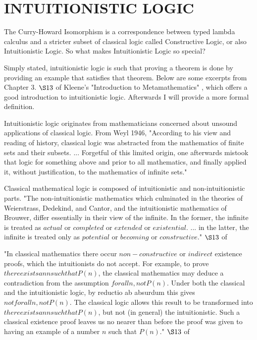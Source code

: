 %
%
\chapter{INTUITIONISTIC LOGIC}\label{ch:logic}
The Curry-Howard Isomorphism is a correspondence between typed lambda calculus and a stricter subset of classical logic called Constructive Logic, or also Intuitionistic Logic. So what makes Intuitionistic Logic so special?

Simply stated, intuitionistic logic is such that proving a theorem is done by providing an example that satisfies that theorem. Below are some excerpts from Chapter 3. $\S 13$ of Kleene's "Introduction to Metamathematics" \cite{metamath}, which offers a good introduction to intuitionistic logic. Afterwards I will provide a more formal definition.

Intuitionistic logic originates from mathematicians concerned about unsound applications of classical logic. From Weyl 1946, "According to his view and reading of history, classical logic was abstracted from the mathematics of finite sets and their subsets. ... Forgetful of this limited origin, one afterwards mistook that logic for something above and prior to all mathematics, and finally applied it, without justification, to the mathematics of infinite sets."

Classical mathematical logic is composed of intuitionistic and non-intuitionistic parts. "The non-intuitionistic mathematics which culminated in the theories of Weierstrass, Dedekind, and Cantor, and the intuitionistic mathematics of Brouwer, differ essentially in their view of the infinite. In the former, the infinite is treated as $actual$ or $completed$ or $extended$ or $existential$. ... in the latter, the infinite is treated only as $potential$ or $becoming$ or $constructive$." $\S 13$ of \cite{metamath}

"In classical mathematics there occur $non-constructive$ or $indirect$ existence proofs, which the intuitionists do not accept. For example, to prove $there exists an n such that P(n)$, the classical mathematics may deduce a contradiction from the assumption $for all n, not P(n)$. Under both the classical and the intuitionistic logic, by reductio ab absurdum this gives $not for all n, not P(n)$. The classical logic allows this result to be transformed into $there exists an n such that P(n)$, but not (in general) the intuitionistic. Such a classical existence proof leaves us no nearer than before the proof was given to having an example of a number $n$ such that $P(n)$." $\S 13$ of \cite{metamath}


